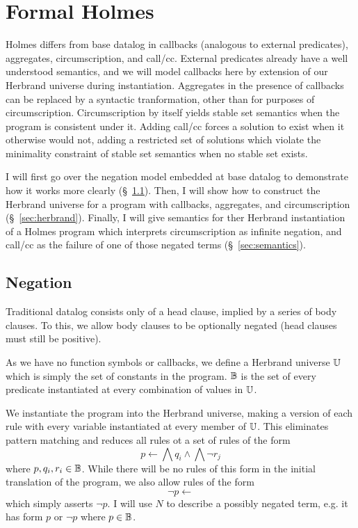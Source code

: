 
\chapter{Formal Holmes}
\label{sec:formal}
Holmes differs from base datalog in callbacks (analogous to external predicates), aggregates, circumscription, and call/cc.
External predicates already have a well understood semantics, and we will model callbacks here by extension of our Herbrand universe during instantiation.
Aggregates in the presence of callbacks can be replaced by a syntactic tranformation, other than for purposes of circumscription.
Circumscription by itself yields stable set semantics when the program is consistent under it.
Adding call/cc forces a solution to exist when it otherwise would not, adding a restricted set of solutions which violate the minimality constraint of stable set semantics when no stable set exists.

I will first go over the negation model embedded at base datalog to demonstrate how it works more clearly (\S~\ref{sec:formal-negation}).
Then, I will show how to construct the Herbrand universe for a program with callbacks, aggregates, and circumscription (\S~\ref{sec:herbrand}).
Finally, I will give semantics for ther Herbrand instantiation of a Holmes program which interprets circumscription as infinite negation, and call/cc as the failure of one of those negated terms (\S~\ref{sec:semantics}).
\section{Negation}
\label{sec:formal-negation}
Traditional datalog consists only of a head clause, implied by a series of body clauses.
To this, we allow body clauses to be optionally negated (head clauses must still be positive).

As we have no function symbols or callbacks, we define a Herbrand universe $\mathbb{U}$ which is simply the set of constants in the program.
$\mathbb{B}$ is the set of every predicate instantiated at every combination of values in $\mathbb{U}$.

We instantiate the program into the Herbrand universe, making a version of each rule with every variable instantiated at every member of $\mathbb{U}$.
This eliminates pattern matching and reduces all rules ot a set of rules of the form
\[
	p \leftarrow \bigwedge q_i \wedge \bigwedge \neg r_j
\]
where $p, q_i, r_i \in \mathbb{B}$.
While there will be no rules of this form in the initial translation of the program, we also allow rules of the form
\[
	\neg p \leftarrow
\]
which simply asserts $\neg p$.
I will use $N$ to describe a possibly negated term, e.g. it has form $p$ or $\neg p$ where $p \in \mathbb{B}$.

